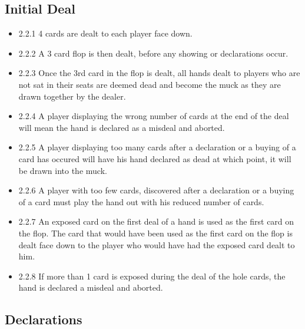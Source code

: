 \documentclass[a4paper,12pt]{article}
\begin{document}
\subsection{Initial Deal}
\begin{itemize}
\item 2.2.1 4 cards are dealt to each player face down.

\item 2.2.2 A 3 card flop is then dealt, before any showing or declarations occur.
\item 2.2.3 Once the 3rd card in the flop is dealt, all hands dealt to players who are not sat in their seats are deemed dead and become the muck as they are drawn together by the dealer.
\item 2.2.4 A player displaying the wrong number of cards at the end of the deal will mean the hand is declared as a misdeal and aborted.
\item 2.2.5 A player displaying too many cards after a declaration or a buying of a card has occured will have his hand declared as dead at which point, it will be drawn into the muck.
\item 2.2.6 A player with too few cards, discovered after a declaration or a buying of a card must play the hand out with his reduced number of cards.
\item 2.2.7 An exposed card on the first deal of a hand is used as the first card on the flop. The card that would have been used as the first card on the flop is dealt face down to the player who would have had the exposed card dealt to him.
\item 2.2.8 If more than 1 card is exposed during the deal of the hole cards, the hand is declared a misdeal and aborted. 
\end{itemize}


\subsection{Declarations}
\end{document}
